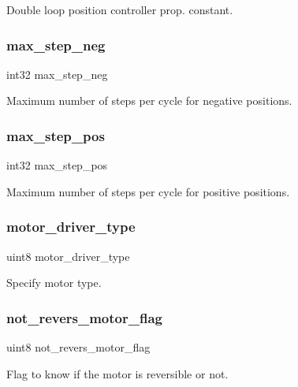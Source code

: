 Double loop position controller prop. constant. \mbox{\label{structst__motor_a14fe3ed96d232dced2d33efc493a0667}} 
\subsubsection{max\+\_\+step\+\_\+neg}
{\footnotesize\ttfamily int32 max\+\_\+step\+\_\+neg}

Maximum number of steps per cycle for negative positions. \mbox{\label{structst__motor_a9be5987152b8c6bb28c1d311bc94e5e3}} 
\subsubsection{max\+\_\+step\+\_\+pos}
{\footnotesize\ttfamily int32 max\+\_\+step\+\_\+pos}

Maximum number of steps per cycle for positive positions. \mbox{\label{structst__motor_ad7083e21e3e766d7e9cc5858b2e659cf}} 
\subsubsection{motor\+\_\+driver\+\_\+type}
{\footnotesize\ttfamily uint8 motor\+\_\+driver\+\_\+type}

Specify motor type. \mbox{\label{structst__motor_a6525eb3c16595104c1d0fbcf0a8d1de4}} 
\subsubsection{not\+\_\+revers\+\_\+motor\+\_\+flag}
{\footnotesize\ttfamily uint8 not\+\_\+revers\+\_\+motor\+\_\+flag}

Flag to know if the motor is reversible or not. \mbox{\label{structst__motor_aa2ceebf7546e978c8b0393ce8035532d}} 
